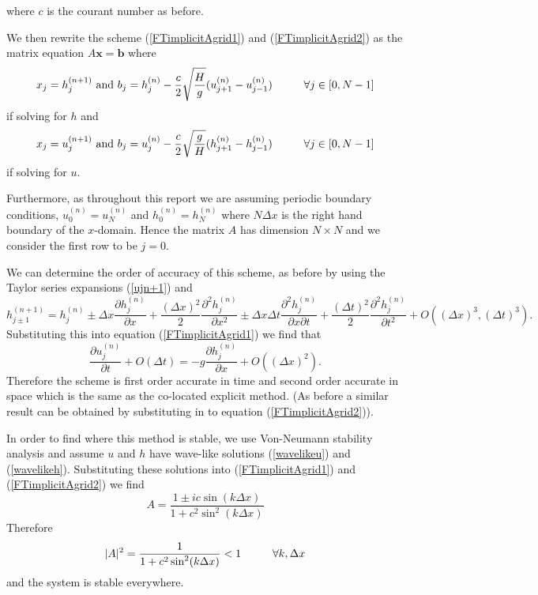 \documentclass[a4paper,12pt, notitlepage]{article}
\newcommand\tab[1][0.05cm]{\hspace*{#1}}
\begin{document}
where $c$ is the courant number as before. 

We then rewrite the scheme (\ref{FTimplicitAgrid1}) and (\ref{FTimplicitAgrid2}) as the matrix equation $A \mathbf{x} = \mathbf{b}$ where 
\begin{equation}
x_{j} = h_{j}^{(n+1)} \text { and } b_{j} = h_{j}^{(n)} - \frac{c}{2}\sqrt{\frac{H}{g}}(u_{j+1}^{(n)} - u_{j-1}^{(n)}) \tab[1cm] \forall j \in [0, N-1]
\end{equation}
if solving for $h$ and
\begin{equation}
x_{j} = u_{j}^{(n+1)} \text { and } b_{j} = u_{j}^{(n)} - \frac{c}{2}\sqrt{\frac{g}{H}}(h_{j+1}^{(n)} - h_{j-1}^{(n)}) \tab[1cm] \forall j \in [0, N-1]
\end{equation}
if solving for $u$.

Furthermore, as throughout this report we are assuming periodic boundary conditions, $u_{0}^{(n)} = u_{N}^{(n)}$ and $h_{0}^{(n)} = h_{N}^{(n)}$ where $N\Delta x$ is the right hand boundary of the $x$-domain. Hence the matrix $A$ has dimension $N \times N$ and we consider the first row to be $j = 0$. 


We can determine the order of accuracy of this scheme, as before by using the Taylor series expansions (\ref{ujn+1}) and
\begin{equation}
h_{j \pm 1}^{(n+1)} = h_{j}^{(n)} \pm \Delta x \frac{\partial h_{j}^{(n)}}{\partial x} + \frac{(\Delta x)^{2}}{2} \frac{\partial^{2}h_{j}^{(n)}}{\partial x^{2}} \pm \Delta x \Delta t \frac{\partial^{2}h_{j}^{(n)}}{\partial x\partial t} + \frac{(\Delta t)^{2}}{2}\frac{\partial^{2}h_{j}^{(n)}}{\partial t^{2}} + O((\Delta x)^{3}, {(\Delta t)^{3}}).
\end{equation}
Substituting this into equation (\ref{FTimplicitAgrid1}) we find that
\begin{equation}
\frac{\partial u_{j}^{(n)}}{\partial t} + O(\Delta t) = - g \frac{\partial h_{j}^{(n)}}{\partial x} + O((\Delta x)^{2}).
\end{equation}
Therefore the scheme is first order accurate in time and second order accurate in space which is the same as the co-located explicit method. (As before a similar result can be obtained by substituting in to equation (\ref{FTimplicitAgrid2})).

In order to find where this method is stable, we use Von-Neumann stability analysis and assume $u$ and $h$ have wave-like solutions (\ref{wavelikeu}) and (\ref{wavelikeh}). Substituting these solutions into (\ref{FTimplicitAgrid1}) and (\ref{FTimplicitAgrid2}) we find
\begin{equation}
A = \frac{1 \pm i c\sin(k\Delta x)}{1 + c^{2}\sin^{2}(k\Delta x)}
\end{equation}
Therefore 
\begin{equation}
\lvert A \rvert ^{2} = \frac{1}{1 + c^{2}\sin^{2}(k\Delta x)} < 1  \tab[1cm] \forall k, \Delta x
\end{equation}
and the system is stable everywhere. 
\end{document}
